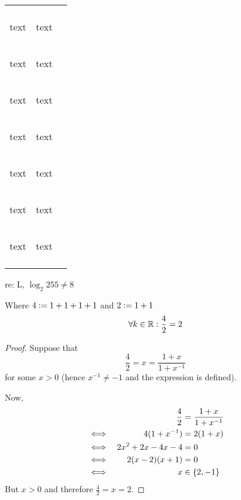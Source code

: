 \begin{center}
\begin{longtable}{ccc}
\begin{tabular}{cc}
{\footnotesize text} \\ %
\begin{small}text\end{small} &
{\small text} \\
\begin{normalsize}text\end{normalsize} &
{\normalsize text} \\ %
\begin{large}text\end{large} &
{\large text} \\
\begin{Large}text\end{Large} &
{\Large text} \\
\begin{LARGE}text\end{LARGE} &
{\LARGE text} \\
\begin{huge}text\end{huge} &
{\huge text} \\
\begin{Huge}text\end{Huge} &
{\Huge text} \\
\end{tabular} \\
\end{longtable}
\end{center}

re: L, \(\log_2 255 \ne 8\)

\begin{lemma}
Where \(4 \vcentcolon= 1 + 1 + 1 + 1\) and \(2 \vcentcolon= 1 + 1\)
\begin{equation}
\forall k \in \mathbb R: \frac 42 = 2
\end{equation}
\end{lemma}

\begin{proof}
Suppose that
\begin{equation*}
\frac 42 = x = \frac{1 + x}{1 + x^{-1}}
\end{equation*}
for some \(x > 0\) (hence \(x^{-1} \neq -1\) and the expression is defined).

Now,
\begin{alignat*}{2}
&&\frac 42 &= \frac{1 + x}{1 + x^{-1}} \\
&\iff& 4(1 + x^{-1}) &= 2(1 + x) \\
&\iff& 2x^2 + 2x - 4x - 4 &= 0 \\
&\iff& 2(x - 2)(x + 1) &= 0 \\
&\iff& x &\in \set{2, -1} \\
\end{alignat*}
But \(x > 0\) and therefore \(\frac 42 = x = 2\).
\end{proof}


